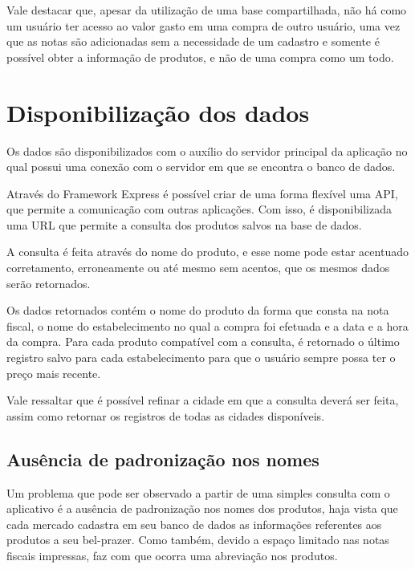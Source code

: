 Vale destacar que, apesar da utilização de uma base compartilhada, não há como um usuário ter acesso ao valor gasto em uma compra de outro usuário, uma vez que as notas são adicionadas sem a necessidade de um cadastro e somente é possível obter a informação de produtos, e não de uma compra como um todo.

\section{Disponibilização dos dados}



Os dados são disponibilizados com o auxílio do servidor principal da aplicação no qual possui uma conexão com o servidor em que se encontra o banco de dados.

Através do Framework Express é possível criar de uma forma flexível uma API, que permite a comunicação com outras aplicações. Com isso, é disponibilizada uma URL que permite a consulta dos produtos salvos na base de dados.

A consulta é feita através do nome do produto, e esse nome pode estar acentuado corretamento, erroneamente ou até mesmo sem acentos, que os mesmos dados serão retornados.

Os dados retornados contém o nome do produto da forma que consta na nota fiscal, o nome do estabelecimento no qual a compra foi efetuada e a data e a hora da compra. Para cada produto compatível com a consulta, é retornado o último registro salvo para cada estabelecimento para que o usuário sempre possa ter o preço mais recente.

Vale ressaltar que é possível refinar a cidade em que a consulta deverá ser feita, assim como retornar os registros de todas as cidades disponíveis.

\subsection{Ausência de padronização nos nomes}

Um problema que pode ser observado a partir de uma simples consulta com o aplicativo é a ausência de padronização nos nomes dos produtos, haja vista que cada mercado cadastra em seu banco de dados as informações referentes aos produtos a seu bel-prazer. Como também, devido a espaço limitado nas notas fiscais impressas, faz com que ocorra uma abreviação nos produtos.

